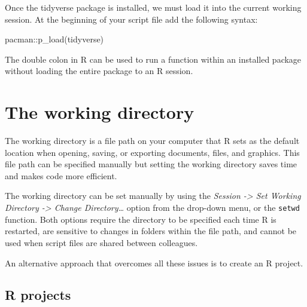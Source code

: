\documentclass[
  letterpaper,
  DIV=11,
  numbers=noendperiod]{scrreprt}
\newenvironment{Shaded}{\begin{snugshade}}{\end{snugshade}}
\newcommand{\FunctionTok}[1]{\textcolor[rgb]{0.28,0.35,0.67}{#1}}
\newcommand{\NormalTok}[1]{\textcolor[rgb]{0.00,0.23,0.31}{#1}}
\newcommand{\SpecialCharTok}[1]{\textcolor[rgb]{0.37,0.37,0.37}{#1}}
\begin{document}
Once the tidyverse package is installed, we must load it into the
current working session. At the beginning of your script file add the
following syntax:

\begin{Shaded}
\begin{Highlighting}[]
\NormalTok{pacman}\SpecialCharTok{::}\FunctionTok{p\_load}\NormalTok{(tidyverse)}
\end{Highlighting}
\end{Shaded}

\begin{tcolorbox}[enhanced jigsaw, bottomrule=.15mm, left=2mm, leftrule=.75mm, bottomtitle=1mm, coltitle=black, colbacktitle=quarto-callout-tip-color!10!white, toptitle=1mm, arc=.35mm, breakable, title=\textcolor{quarto-callout-tip-color}{\faLightbulb}\hspace{0.5em}{Style tip}, rightrule=.15mm, toprule=.15mm, opacityback=0, opacitybacktitle=0.6, titlerule=0mm, colback=white, colframe=quarto-callout-tip-color-frame]

The double colon in R can be used to run a function within an installed
package without loading the entire package to an R session.

\end{tcolorbox}

\section{The working directory}\label{the-working-directory}

The working directory is a file path on your computer that R sets as the
default location when opening, saving, or exporting documents, files,
and graphics. This file path can be specified manually but setting the
working directory saves time and makes code more efficient.

The working directory can be set manually by using the \emph{Session
-\textgreater{} Set Working Directory -\textgreater{} Change
Directory\ldots{}} option from the drop-down menu, or the \texttt{setwd}
function. Both options require the directory to be specified each time R
is restarted, are sensitive to changes in folders within the file path,
and cannot be used when script files are shared between colleagues.

An alternative approach that overcomes all these issues is to create an
R project.

\subsection{R projects}\label{r-projects}
\end{document}
